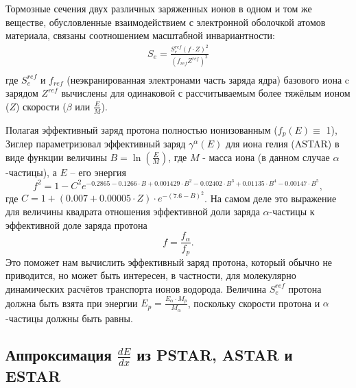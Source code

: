 \documentclass[a4paper,12pt]{article}
\begin{document}
\begin{large}
 Тормозные сечения двух различных заряженных ионов в одном и том же веществе, обусловленные взаимодействием с электронной оболочкой атомов материала, связаны соотношением масштабной инвариантности:
  \begin{equation}
  \begin{split}
  \label{ChargeScailing}
  S_e=\frac{S_e^{ref}(f\cdot Z)^2}{(f_{ref}Z^{ref})^2} \\
  \end{split}
  \end{equation}
  где $S_e^{ref}$ и $f_{ref}$ (неэкранированная электронами часть заряда ядра) базового иона c зарядом $Z^{ref}$ вычислены для одинаковой с рассчитываемым более тяжёлым ионом ($Z$) скорости ($\beta$ или $\frac{E}{M}$).

  Полагая эффективный заряд протона полностью ионизованным ($f_p(E)\equiv$ 1), Зиглер параметризовал эффективный заряд $\gamma^\alpha(E)$ для иона гелия (ASTAR) в виде функции величины $B=\ln(\frac{E}{M})$, где $M$ - масса иона (в данном случае $\alpha$-частицы), а $E$ -- его энергия
  \begin{equation}
  \label{Hegamma}
  f^2=1-C^2e^{-0.2865-0.1266\cdot B+0.001429\cdot B^2-0.02402\cdot B^3+0.01135\cdot B^4-0.00147\cdot B^5},
  \end{equation}
где $C=1+(0.007+0.00005\cdot Z)\cdot e^{-(7.6-B)^2}$.
  На самом деле это выражение для величины квадрата отношения эффективной доли заряда $\alpha$-частицы к эффективной доле заряда протона
  \begin{equation}
  \label{pseudo-gamma}
    f=\frac{f_\alpha}{f_p}.
  \end{equation}
 Это поможет нам вычислить эффективный заряд протона, который обычно не приводится, но может быть интересен, в частности, для молекулярно динамических расчётов транспорта ионов водорода.
  Величина $S_e^{ref}$ протона должна быть взята при энергии $E_p=\frac{E_\alpha\cdot M_p}{M_\alpha}$, поскольку скорости протона и $\alpha$-частицы должны быть равны.

\subsection{Аппроксимация $\frac{dE}{dx}$ из PSTAR, ASTAR и ESTAR }
\label{dEdx1}
  

\end{large}
\end{document}
